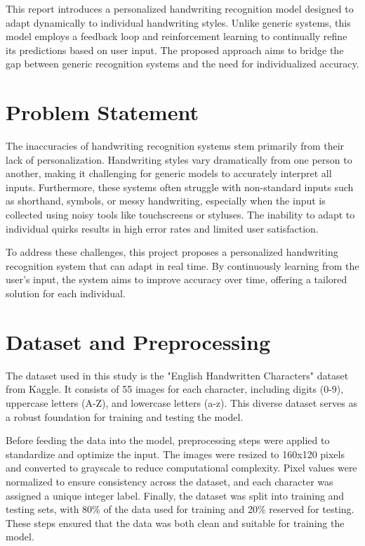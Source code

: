 \documentclass[journal]{IEEEtran}
\begin{document}
This report introduces a personalized handwriting recognition model designed to adapt dynamically to individual handwriting styles. Unlike generic systems, this model employs a feedback loop and reinforcement learning to continually refine its predictions based on user input. The proposed approach aims to bridge the gap between generic recognition systems and the need for individualized accuracy.

\section{Problem Statement}
The inaccuracies of handwriting recognition systems stem primarily from their lack of personalization. Handwriting styles vary dramatically from one person to another, making it challenging for generic models to accurately interpret all inputs. Furthermore, these systems often struggle with non-standard inputs such as shorthand, symbols, or messy handwriting, especially when the input is collected using noisy tools like touchscreens or styluses. The inability to adapt to individual quirks results in high error rates and limited user satisfaction.

To address these challenges, this project proposes a personalized handwriting recognition system that can adapt in real time. By continuously learning from the user's input, the system aims to improve accuracy over time, offering a tailored solution for each individual.

\section{Dataset and Preprocessing}
The dataset used in this study is the "English Handwritten Characters" dataset from Kaggle. It consists of 55 images for each character, including digits (0-9), uppercase letters (A-Z), and lowercase letters (a-z). This diverse dataset serves as a robust foundation for training and testing the model.

Before feeding the data into the model, preprocessing steps were applied to standardize and optimize the input. The images were resized to 160x120 pixels and converted to grayscale to reduce computational complexity. Pixel values were normalized to ensure consistency across the dataset, and each character was assigned a unique integer label. Finally, the dataset was split into training and testing sets, with 80\% of the data used for training and 20\% reserved for testing. These steps ensured that the data was both clean and suitable for training the model.
\end{document}
